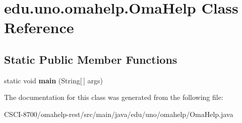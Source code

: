 \hypertarget{classedu_1_1uno_1_1omahelp_1_1_oma_help}{}\section{edu.\+uno.\+omahelp.\+Oma\+Help Class Reference}
\label{classedu_1_1uno_1_1omahelp_1_1_oma_help}
\subsection*{Static Public Member Functions}
\begin{DoxyCompactItemize}
\item 
\mbox{\label{classedu_1_1uno_1_1omahelp_1_1_oma_help_a1b402c161985af62d6784e8f33e1a58c}} 
static void {\bfseries main} (String\mbox{[}$\,$\mbox{]} args)
\end{DoxyCompactItemize}


The documentation for this class was generated from the following file\+:\begin{DoxyCompactItemize}
\item 
C\+S\+C\+I-\/8700/omahelp-\/rest/src/main/java/edu/uno/omahelp/Oma\+Help.\+java\end{DoxyCompactItemize}
